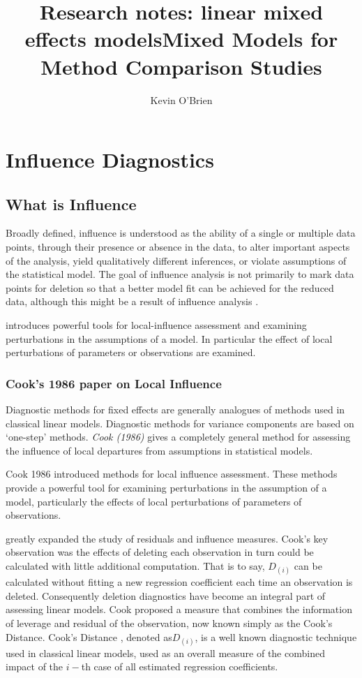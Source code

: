 \documentclass[12pt, a4paper]{report}
\title{Research notes: linear mixed effects models}
\author{ } \date{ }
\theoremstyle{plain}
\theoremstyle{definition}
\theoremstyle{remark}
\begin{document}
\author{Kevin O'Brien}
\title{Mixed Models for Method Comparison Studies}
\tableofcontents

\chapter{Influence Diagnostics}




\section{What is Influence} %


Broadly defined, influence is understood as the ability of a single or multiple data points, through their presence or absence in the data, to alter important aspects of the analysis, yield qualitatively different inferences, or violate assumptions of the statistical model. The goal of influence analysis is not primarily to mark data points for deletion so that a better model fit can be achieved for the reduced data, although this might be a result of influence analysis \citep{schabenberger}.



\citet{cook86} introduces powerful tools for local-influence assessment and examining perturbations in the assumptions of a model. In particular the effect of local perturbations of parameters or observations are examined.


\subsection{Cook's 1986 paper on Local Influence}%

Diagnostic methods for fixed effects are generally analogues of methods used in classical linear models.
Diagnostic methods for variance components are based on `one-step' methods.
\textit{Cook (1986)} gives a completely general method for assessing the influence of local departures from assumptions in statistical models.

Cook 1986 introduced methods for local influence assessment. These methods provide a powerful tool for examining perturbations in the assumption of a model, particularly the effects of local perturbations of parameters of observations.


\citet{cook77} greatly expanded the study of residuals and influence measures.  Cook's key observation was the effects of deleting each observation in turn could be calculated with little additional computation. That is to say, $D_{(i)}$ can be calculated without fitting a new regression coefficient each time an observation is deleted.  Consequently deletion diagnostics have become an integral part of assessing linear models. Cook proposed a measure that combines the information of leverage and residual of the observation, now known simply as the Cook's Distance. Cook's Distance , denoted as$D_{(i)}$, is a well known diagnostic technique used in classical linear models, used as an overall measure of the combined impact of the $i-$th case of all estimated regression coefficients.
\end{document}
